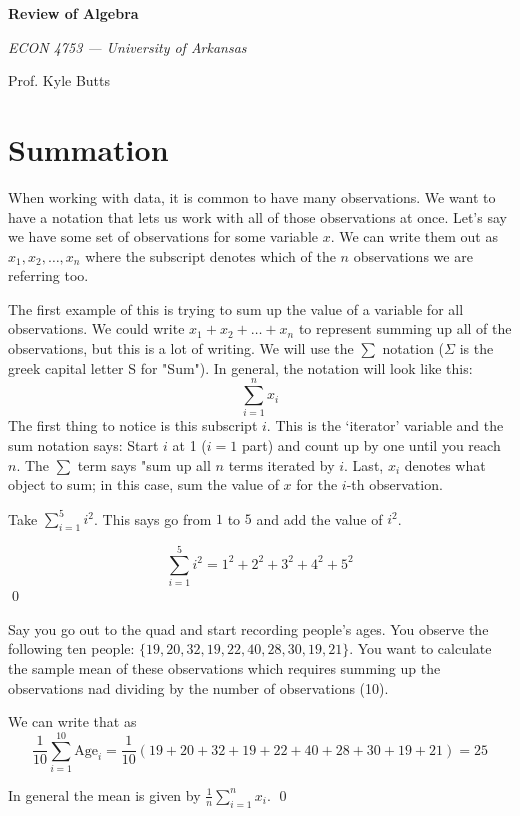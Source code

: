 \documentclass[12pt]{article}
\begin{document}
\begin{center}
  {\Huge\bf Review of Algebra}
  
  \smallskip
  {\large\it ECON 4753 — University of Arkansas}

  \medskip
  {\large Prof. Kyle Butts}
\end{center}

\section{Summation}

When working with data, it is common to have many observations. We want to have a notation that lets us work with all of those observations at once. Let's say we have some set of observations for some variable $x$. We can write them out as $x_1, x_2, \dots, x_n$ where the subscript denotes which of the $n$ observations we are referring too.

The first example of this is trying to sum up the value of a variable for all observations. We could write $x_1 + x_2 + \dots + x_n$ to represent summing up all of the observations, but this is a lot of writing. 
We will use the $\sum$ notation ($\Sigma$ is the greek capital letter S for "Sum"). 
In general, the notation will look like this:
\begin{equation} 
  \sum_{i = 1}^n x_i
\end{equation}
The first thing to notice is this subscript $i$. This is the `iterator' variable and the sum notation says: Start $i$ at 1 ($i = 1$ part) and count up by one until you reach $n$. The $\sum$ term says "sum up all $n$ terms iterated by $i$. Last, $x_i$ denotes what object to sum; in this case, sum the value of $x$ for the $i$-th observation.

\begin{example}
  Take $\sum_{i=1}^5 i^2$. This says go from $1$ to $5$ and add the value of $i^2$. 
  
  $$
    \sum_{i=1}^5 i^2 = 1^2 + 2^2 + 3^2 + 4^2 + 5^2
  $$
  \qed
\end{example}

\begin{example}
  Say you go out to the quad and start recording people's ages. You observe the following ten people: $\{ 19, 20, 32, 19, 22, 40, 28, 30, 19, 21 \}$. You want to calculate the sample mean of these observations which requires summing up the observations nad dividing by the number of observations (10). 
  
  We can write that as
  $$
    \frac{1}{10} \sum_{i=1}^{10} \text{Age}_i = \frac{1}{10} \left( 19 + 20 + 32 + 19 + 22 + 40 + 28 + 30 + 19 + 21 \right) = 25
  $$
  
  In general the mean is given by $\frac{1}{n} \sum_{i=1}^n x_i$. \qed
\end{example}
\end{document}
